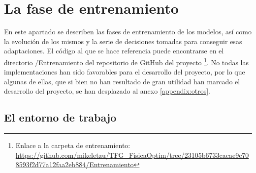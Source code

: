 \section{La fase de entrenamiento}
\label{sec:EntrenamientoPython}

En este apartado se describen las fases de entrenamiento de los modelos, así como la evolución de los mismos y la serie de decisiones tomadas para conseguir esas adaptaciones. El código al que se hace referencia puede encontrarse en el directorio /Entrenamiento del repositorio de GitHub del proyecto \footnote{Enlace a la carpeta de entrenamiento: \url{https://github.com/mikeletzu/TFG_FisicaOptim/tree/23105b6733cacae9c708593f2d77a12faa2eb884/Entrenamiento}}. No todas las implementaciones han sido favorables para el desarrollo del proyecto, por lo que algunas de ellas, que si bien no han resultado de gran utilidad han marcado el desarrollo del proyecto, se han desplazado al anexo \ref{appendix:otros}.

\subsection{El entorno de trabajo}

